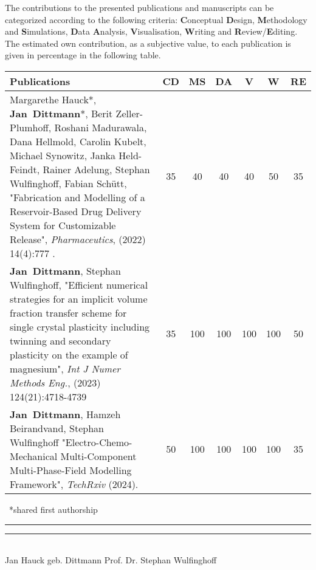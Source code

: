 The contributions to the presented publications and manuscripts can be categorized according to the following criteria: \textbf{C}onceptual \textbf{D}esign, \textbf{M}ethodology and \textbf{S}imulations, \textbf{D}ata \textbf{A}nalysis, \textbf{V}isualisation, \textbf{W}riting and \textbf{R}eview/\textbf{E}diting. The estimated own contribution, as a subjective value, to each publication is given in percentage in the following table.


	\begin{xltabular}{\textwidth}{| L | c | c | c | c | c | c |}
	\hline    
		\textbf{Publications} & \textbf{CD} & \textbf{MS} & \textbf{DA} & \textbf{V} & \textbf{W} & \textbf{RE}\tabularnewline 
		\hline    
Margarethe Hauck*, \mbox{\textbf{Jan Dittmann}*}, Berit Zeller-Plumhoff, Roshani Madurawala, Dana Hellmold,  Carolin Kubelt, Michael Synowitz, Janka Held-Feindt, Rainer Adelung, Stephan Wulfinghoff, Fabian Schütt, "Fabrication and Modelling of a Reservoir-Based Drug Delivery System for Customizable Release", \textit{Pharmaceutics}, (2022) 14(4):777 .&35&40&40&40&50&35\tabularnewline \hline
\mbox{\textbf{Jan Dittmann}}, Stephan Wulfinghoff, "Efficient numerical strategies for an implicit volume fraction transfer scheme for single crystal plasticity including twinning and secondary plasticity on the example of magnesium", \textit{Int J Numer Methods Eng.}, (2023) 124(21):4718-4739 & 35 & 100 & 100 & 100 & 100 & 50 \\ \hline
\mbox{\textbf{Jan Dittmann}}, Hamzeh Beirandvand, Stephan Wulfinghoff "Electro-Chemo-Mechanical Multi-Component Multi-Phase-Field Modelling Framework", \textit{TechRxiv} (2024). & 50 & 100 & 100 & 100 & 100 & 35 \\ \hline
\end{xltabular} 
\vspace{-0.3cm}
{\small \ *shared first authorship} \vspace{4cm} \\
\rule{5cm}{0.2pt} \hspace{4cm} \rule{5cm}{0.2pt}\\ 
\hspace*{0cm} Jan Hauck geb. Dittmann \hspace{3.9cm} Prof. Dr. Stephan Wulfinghoff

